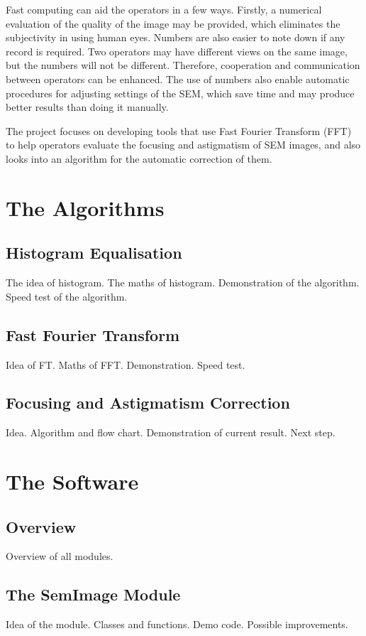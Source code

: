 \documentclass{article}
\begin{document}
Fast computing can aid the operators in a few ways. Firstly, a numerical evaluation of the quality of the image may be provided, which eliminates the subjectivity in using human eyes. Numbers are also easier to note down if any record is required. Two operators may have different views on the same image, but the numbers will not be different. Therefore, cooperation and communication between operators can be enhanced. The use of numbers also enable automatic procedures for adjusting settings of the SEM, which save time and may produce better results than doing it manually.

The project focuses on developing tools that use Fast Fourier Transform (FFT) to help operators evaluate the focusing and astigmatism of SEM images, and also looks into an algorithm for the automatic correction of them.

\section{The Algorithms}
\subsection{Histogram Equalisation}
The idea of histogram.
The maths of histogram.
Demonstration of the algorithm.
Speed test of the algorithm.

\subsection{Fast Fourier Transform} 
Idea of FT.
Maths of FFT.
Demonstration.
Speed test. 

\subsection{Focusing and Astigmatism Correction}
Idea.
Algorithm and flow chart.
Demonstration of current result.
Next step.

\section{The Software}
\subsection{Overview}
Overview of all modules.

\subsection{The SemImage Module}
Idea of the module.
Classes and functions.
Demo code.
Possible improvements.
\end{document}
